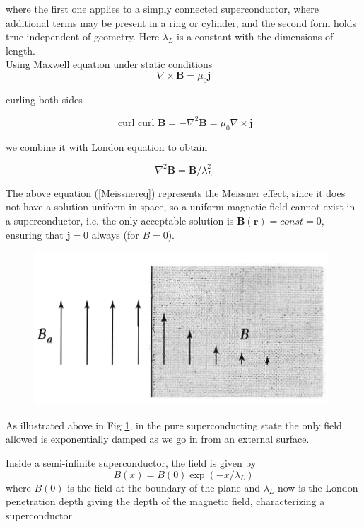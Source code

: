 \documentclass[openany,11pt,a4paper]{report}
\begin{document}
where the first one
applies to a simply connected superconductor, where additional terms may be present in a ring or cylinder, and the second form holds true independent of geometry. Here $\lambda_{L}$ is a constant with the dimensions of length.\\

Using Maxwell equation under static conditions
\begin{equation}
\nabla \times \textbf{B}=\mu_{0} \textbf{j}
\end{equation}

curling both sides

\begin{equation}
\text { curl curl } \mathbf{B}=-\nabla^{2} \mathbf{B}=\mu_{0} \nabla \times \mathbf{j}
\end{equation}

we combine it with London equation to obtain

\begin{equation}
\nabla^{2} \mathbf{B}=\mathbf{B} / \lambda_{L}^{2}
\label{Meissnereq}
\end{equation}


The above equation (\ref{Meissnereq}) represents the Meissner effect, since it does not have a solution uniform in space, so a uniform magnetic field cannot
exist in a superconductor, i.e. the only acceptable solution is $\textbf{B}(\textbf{r})=const=0$, ensuring that $\textbf{j}=0$ always (for $B=0$). 


\begin{figure}[H]
\centering
\caption{\cite{kittel}}
\includegraphics[scale=0.7]{penetration.PNG}    
\label{Fig:pen}
\end{figure}

As illustrated above in Fig \ref{Fig:pen}, in the pure superconducting state the only field allowed is exponentially
damped as we go in from an external surface.

Inside a semi-infinite superconductor, the field is given by
\begin{equation}
B(x)=B(0) \exp \left(-x / \lambda_{L}\right)
\label{penetr}
\end{equation}
where $B(0)$ is the field at the boundary of the plane and $\lambda_{L}$ now is the London penetration depth giving the depth of the magnetic field, characterizing
a superconductor 
\end{document}
